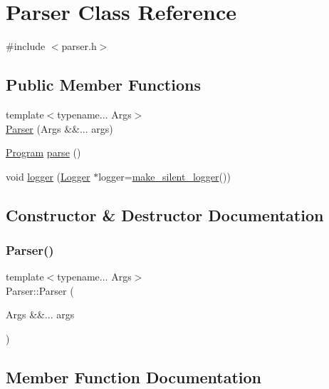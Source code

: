 \hypertarget{class_parser}{}\section{Parser Class Reference}
\label{class_parser}


{\ttfamily \#include $<$parser.\+h$>$}

\subsection*{Public Member Functions}
\begin{DoxyCompactItemize}
\item 
{\footnotesize template$<$typename... Args$>$ }\\\hyperlink{class_parser_aefb50af00ae004bfb809380c45a5ad7d}{Parser} (Args \&\&... args)
\item 
\hyperlink{struct_program}{Program} \hyperlink{class_parser_a20466f8f29d69499dfa12092cd737211}{parse} ()
\item 
void \hyperlink{class_parser_a701d2024f028532d2ebc8076f738fbc1}{logger} (\hyperlink{class_logger}{Logger} $\ast$logger=\hyperlink{logger_8h_a4a91393d9aac15039de84d6a92cadfd0}{make\+\_\+silent\+\_\+logger}())
\end{DoxyCompactItemize}


\subsection{Constructor \& Destructor Documentation}
\mbox{\label{class_parser_aefb50af00ae004bfb809380c45a5ad7d}} 
\subsubsection{\texorpdfstring{Parser()}{Parser()}}
{\footnotesize\ttfamily template$<$typename... Args$>$ \\
Parser\+::\+Parser (\begin{DoxyParamCaption}\item[{Args \&\&...}]{args }\end{DoxyParamCaption})\hspace{0.3cm}{\ttfamily [inline]}}



\subsection{Member Function Documentation}
\mbox{\label{class_parser_a701d2024f028532d2ebc8076f738fbc1}} 
